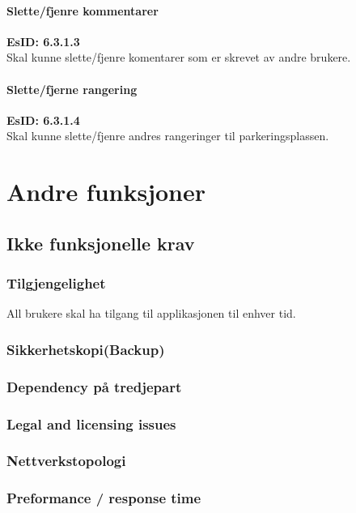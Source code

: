 \documentclass[12pt]{article}
\begin{document}
            \paragraph{Slette/fjenre kommentarer}
            \textbf{EsID: 6.3.1.3}\\Skal kunne slette/fjenre komentarer som er skrevet av andre brukere.

            \paragraph{Slette/fjerne rangering}
            \textbf{EsID: 6.3.1.4}\\Skal kunne slette/fjenre andres rangeringer til parkeringsplassen.

           
\section{Andre funksjoner}
    \subsection{Ikke funksjonelle krav}

        \subsubsection{Tilgjengelighet}
        All brukere skal ha tilgang til applikasjonen til enhver tid.
        
        \subsubsection{Sikkerhetskopi(Backup)}


        \subsubsection{Dependency på tredjepart}


        \subsubsection{Legal and licensing issues}


        \subsubsection{Nettverkstopologi}


        \subsubsection{Preformance / response time}
\end{document}
